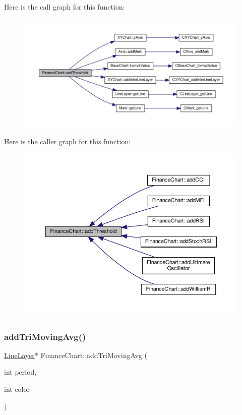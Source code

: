 Here is the call graph for this function\+:
\nopagebreak
\begin{figure}[H]
\begin{center}
\leavevmode
\includegraphics[width=350pt]{class_finance_chart_ae08738c0df88ccd4d75ed3860f353839_cgraph}
\end{center}
\end{figure}
Here is the caller graph for this function\+:
\nopagebreak
\begin{figure}[H]
\begin{center}
\leavevmode
\includegraphics[width=350pt]{class_finance_chart_ae08738c0df88ccd4d75ed3860f353839_icgraph}
\end{center}
\end{figure}
\mbox{\label{class_finance_chart_a1cc644d76bda3086c2c9bf1fbd98d8cd}} 
\subsubsection{\texorpdfstring{add\+Tri\+Moving\+Avg()}{addTriMovingAvg()}}
{\footnotesize\ttfamily \hyperlink{class_line_layer}{Line\+Layer}$\ast$ Finance\+Chart\+::add\+Tri\+Moving\+Avg (\begin{DoxyParamCaption}\item[{int}]{period,  }\item[{int}]{color }\end{DoxyParamCaption})\hspace{0.3cm}{\ttfamily [inline]}}



